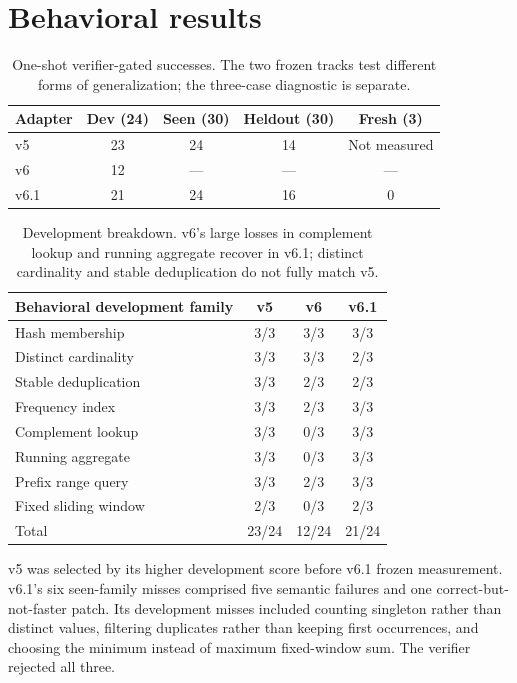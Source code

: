 \documentclass[11pt]{article}
\begin{document}


\section{Behavioral results}
\begin{table}[h]
\centering\small
\begin{tabular}{lcccc}
\toprule
Adapter & Dev (24) & Seen (30) & Heldout (30) & Fresh (3) \\
\midrule
v5 & 23 & 24 & 14 & Not measured \\
v6 & 12 & --- & --- & --- \\
v6.1 & 21 & 24 & 16 & 0 \\
\bottomrule
\end{tabular}
\caption{One-shot verifier-gated successes. The two frozen tracks test
different forms of generalization; the three-case diagnostic is separate.}
\end{table}

\begin{table}[htbp]
\centering\small
\begin{tabular}{lccc}
\toprule
Behavioral development family & v5 & v6 & v6.1 \\
\midrule
Hash membership & 3/3 & 3/3 & 3/3 \\
Distinct cardinality & 3/3 & 3/3 & 2/3 \\
Stable deduplication & 3/3 & 2/3 & 2/3 \\
Frequency index & 3/3 & 2/3 & 3/3 \\
Complement lookup & 3/3 & 0/3 & 3/3 \\
Running aggregate & 3/3 & 0/3 & 3/3 \\
Prefix range query & 3/3 & 2/3 & 3/3 \\
Fixed sliding window & 2/3 & 0/3 & 2/3 \\
\midrule
Total & 23/24 & 12/24 & 21/24 \\
\bottomrule
\end{tabular}
\caption{Development breakdown. v6's large losses in complement lookup and
running aggregate recover in v6.1; distinct cardinality and stable
deduplication do not fully match v5.}
\label{tab:devfamilies}
\end{table}



v5 was selected by its higher development score before v6.1 frozen
measurement. v6.1's six seen-family misses comprised five semantic failures
and one correct-but-not-faster patch. Its development misses included counting
singleton rather than distinct values, filtering duplicates rather than
keeping first occurrences, and choosing the minimum instead of maximum
fixed-window sum. The verifier rejected all three.
\end{document}
